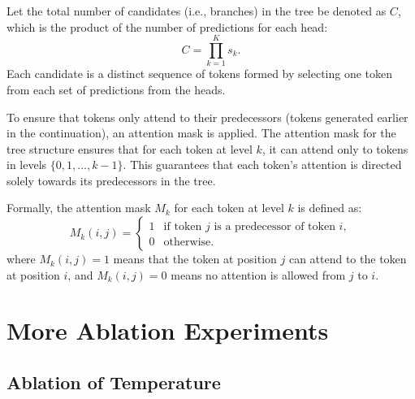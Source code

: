 Let the total number of candidates (i.e., branches) in the tree be denoted as \( C \), which is the product of the number of predictions for each head:
\begin{equation}
\nonumber
C = \prod_{k=1}^K s_k.
\end{equation}
Each candidate is a distinct sequence of tokens formed by selecting one token from each set of predictions from the heads.

To ensure that tokens only attend to their predecessors (tokens generated earlier in the continuation), an attention mask is applied. The attention mask for the tree structure ensures that for each token at level \( k \), it can attend only to tokens in levels \( \{0, 1, \dots, k-1\} \). This guarantees that each token's attention is directed solely towards its predecessors in the tree.

Formally, the attention mask \( M_k \) for each token at level \( k \) is defined as:
\[
\nonumber
M_k(i,j) = 
\begin{cases}
1 & \text{if token } j \text{ is a predecessor of token } i, \\
0 & \text{otherwise}.
\end{cases}
\]
where \( M_k(i,j) = 1 \) means that the token at position \( j \) can attend to the token at position \( i \), and \( M_k(i,j) = 0 \) means no attention is allowed from \( j \) to \( i \).



\section{More Ablation Experiments}

\subsection{Ablation of Temperature}

